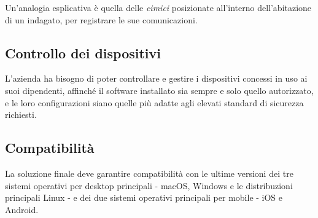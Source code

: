 Un'analogia esplicativa è quella delle \emph{cimici} posizionate all'interno dell'abitazione di un indagato, per registrare le sue comunicazioni.

\subsection{Controllo dei dispositivi}
L'azienda ha bisogno di poter controllare e gestire i dispositivi concessi in uso ai suoi dipendenti, affinché il software installato sia sempre e solo quello autorizzato, e le loro configurazioni siano quelle più adatte agli elevati standard di sicurezza richiesti.

\subsection{Compatibilità}
La soluzione finale deve garantire compatibilità con le ultime versioni dei tre sistemi operativi per desktop principali - macOS, Windows e le distribuzioni principali Linux -  e dei due sistemi operativi principali per mobile - iOS e Android.